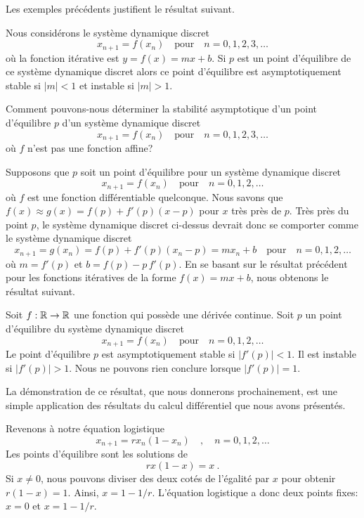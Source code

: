 {Les exemples précédents justifient le résultat suivant.

\begin{prop}
Nous considérons le système dynamique discret
\[
x_{n+1} = f(x_n) \quad \text{pour} \quad n=0, 1, 2, 3, \ldots
\]
où la fonction itérative est $y=f(x) = m x +b$.  Si $p$ est un point
d'équilibre de ce système dynamique discret alors ce point d'équilibre
est asymptotiquement stable si $|m|<1$ et instable si $|m|>1$.
\end{prop}

Comment pouvons-nous déterminer la stabilité asymptotique d'un point
d'équilibre $p$ d'un système dynamique discret
\[
x_{n+1} = f(x_n) \quad \text{pour} \quad n=0, 1, 2, 3, \ldots
\]
où $f$ n'est pas une fonction affine?

Supposons que $p$ soit un point d'équilibre pour un système dynamique
discret
\[
x_{n+1} = f(x_n) \quad \text{pour} \quad n =0, 1, 2 ,\ldots
\]
où $f$ est une fonction différentiable quelconque.  Nous savons que
$f(x) \approx g(x) = f(p) + f'(p) (x-p)$ pour $x$ très près de $p$.
Très près du point $p$, le système dynamique discret ci-dessus devrait
donc se comporter comme le système dynamique discret
\[
x_{n+1} = g(x_n) = f(p) + f'(p) (x_n-p) = m x_n + b \quad \text{pour} \quad
n=0,1,2,\ldots
\]
où $m = f'(p)$ et $b = f(p) - p\,f'(p)$.  En se basant sur le résultat
précédent pour les fonctions itératives de la forme $f(x) = mx+b$,
nous obtenons le résultat suivant.

\begin{theorem} \label{sdd_stab_th}
Soit $f:\mathbb{R} \to \mathbb{R}$ une fonction qui possède une dérivée continue.
Soit $p$ un point d'équilibre du système dynamique discret
\[
x_{n+1}=f(x_n) \quad \text{pour} \quad n=0, 1, 2, \ldots
\]
Le point d'équilibre $p$ est asymptotiquement stable si
$|f'(p)| < 1$.  Il est instable si $|f'(p)|>1$.  Nous ne pouvons rien
conclure lorsque $|f'(p)|=1$.
\end{theorem}

La démonstration de ce résultat, que nous donnerons prochainement, est
une simple application des résultats du calcul différentiel que nous
avons présentés.

Revenons à notre équation logistique
\[
x_{n+1} = r x_n (1-x_n) \quad , \quad n=0,1,2,\ldots
\]
Les points d'équilibre sont les solutions de
\[
r x (1-x) = x \ .
\]
Si $x\neq 0$, nous pouvons diviser des deux cotés de l'égalité par $x$ pour
obtenir $r (1-x)=1$.  Ainsi, $x = 1 - 1/r$.  L'équation logistique a
donc deux points fixes: $x=0$ et $x=1-1/r$.

}
